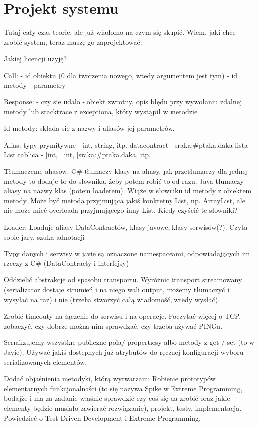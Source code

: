\chapter{Projekt systemu}
Tutaj cały czas teorie, ale już wiadomo na czym się skupić. Wiem, jaki chcę zrobić system, teraz muszę go zaprojektować.

Jakiej licencji użyję?

Call:
- id obiektu (0 dla tworzenia nowego, wtedy argumentem jest tym)
- id metody
- parametry

Response:
- czy sie udalo
- obiekt zwrotny, opis błędu przy wywołaniu zdalnej metody lub stacktrace z exceptiona, który wystąpił w metodzie

Id metody:
składa się z nazwy i aliasów jej parametrów.

Alias:
typy prymitywne - int, string, itp.
datacontract - sraka:\#ptaka.daka
lista - List
tablica - [int, [[int, [sraka:\#ptaka.daka, itp.

Tłumaczenie aliasów:
C\# tłumaczy klasy na aliasy, jak przetłumaczy dla jednej metody to dodaje to do słownika, żeby potem robić to od razu.
Java tłumaczy aliasy na nazwy klas (potem loaderem). Wiąże w słowniku id metody z obiektem metody. Może być metoda przyjmująca jakiś konkretny List, np. ArrayList, ale nie może mieć overloada przyjmującego inny List.
Kiedy czyścić te słowniki?

Loader:
Loaduje aliasy DataContractów, klasy javowe, klasy serwisów(?). Czyta sobie jary, szuka adnotacji

Typy danych i serwisy w javie są oznaczone namespaceami, odpowiadających im rzeczy z C\# (DataContracty i interfejsy)

Oddzielić abstrakcje od sposobu transportu. Wyróżnic transport streamowany (serializator dostaje strumień i na niego wali output, możemy tłumaczyć i wysyłać na raz) i nie (trzeba stworzyć całą wiadomość, wtedy wysłać).

Zrobić timeouty na łączenie do serwisu i na operacje. Poczytać więcej o TCP, zobaczyć, czy dobrze można nim sprawdzać, czy trzeba używać PINGa.

Serializujemy wszystkie publiczne pola/ propertiesy albo metody z get / set (to w Javie). Używać jakiś dostępnych już atrybutów do ręcznej konfiguracji wyboru serializowanych elementów.

Dodać objaśnienia metodyki, którą wytwarzam:
Robienie prototypów elementarnych funkcjonalności (to się nazywa Spike w Extreme Programming, bodajże i ma za zadanie właśnie sprawdzić czy coś się da zrobić oraz jakie elementy będzie musiało zawierać rozwiązanie), projekt, testy, implementacja. Powiedzieć o Test Driven Development i Extreme Programming.

